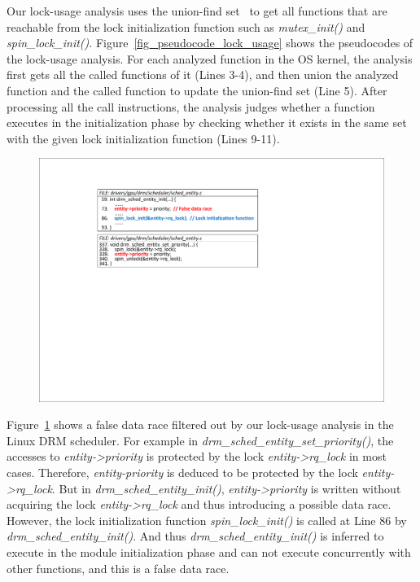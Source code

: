 Our lock-usage analysis uses the union-find set~\cite{Galler:ACM64} to get all 
functions that are reachable from the lock initialization function such as {\em 
mutex\_init()} and {\em spin\_lock\_init()}. 
Figure~\ref{fig_pseudocode_lock_usage} shows the pseudocodes of the lock-usage 
analysis. For each analyzed function in the OS kernel, the analysis first gets 
all the called functions of it (Lines 3-4), and then union the analyzed  
function and the called function to update the union-find set (Line 5). After 
processing all the call instructions, the analysis judges whether a function 
executes in the initialization phase by checking whether it exists in the same 
set with the given lock initialization function (Lines 9-11).

\begin{figure}[htbp]
	\centering
	\includegraphics[width=0.9\linewidth]{figures/fig_demo_lock_usage.pdf}
	\label{fig_demo_lock_usage}
\end{figure}

 Figure~\ref{fig_demo_lock_usage} shows a false 
data race filtered out by our lock-usage analysis in the Linux DRM scheduler. 
For example in {\em drm\_sched\_entity\_set\_priority()}, the accesses to {\em 
entity->priority} is protected by the lock {\em entity->rq\_lock} in most 
cases. Therefore, {\em entity-priority} is deduced to be protected by the lock 
{\em entity->rq\_lock}. But in {\em drm\_sched\_entity\_init()}, {\em 
entity->priority} is written without acquiring the lock {\em entity->rq\_lock} 
and thus introducing a possible data race. However, the lock initialization 
function {\em spin\_lock\_init()} is called at Line 86 by {\em 
drm\_sched\_entity\_init()}. And thus {\em drm\_sched\_entity\_init()} is 
inferred to execute in the module initialization phase and can not execute 
concurrently with other functions, and this is a false data race.


